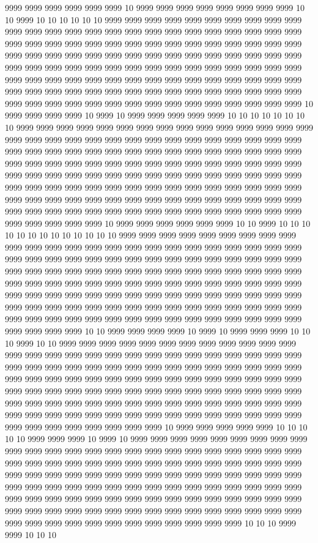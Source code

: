 9999 9999 9999 9999 9999 9999 10 9999 9999 9999 9999 9999 9999 9999 9999 10 10 9999 10 10 10 10 10 10 9999 9999 9999 9999 9999 9999 9999 9999 9999 9999 9999 9999 9999 9999 9999 9999 9999 9999 9999 9999 9999 9999 9999 9999 9999 9999 9999 9999 9999 9999 9999 9999 9999 9999 9999 9999 9999 9999 9999 9999 9999 9999 9999 9999 9999 9999 9999 9999 9999 9999 9999 9999 9999 9999 9999 9999 9999 9999 9999 9999 9999 9999 9999 9999 9999 9999 9999 9999 9999 9999 9999 9999 9999 9999 9999 9999 9999 9999 9999 9999 9999 9999 9999 9999 9999 9999 9999 9999 9999 9999 9999 9999 9999 9999 9999 9999 9999 9999 9999 9999 9999 9999 9999 9999 9999 9999 9999 9999 9999 9999 9999 9999 9999 9999 9999 10 9999 9999 9999 9999 10 9999 10 9999 9999 9999 9999 9999 10 10 10 10 10 10 10 10 9999 9999 9999 9999 9999 9999 9999 9999 9999 9999 9999 9999 9999 9999 9999 9999 9999 9999 9999 9999 9999 9999 9999 9999 9999 9999 9999 9999 9999 9999 9999 9999 9999 9999 9999 9999 9999 9999 9999 9999 9999 9999 9999 9999 9999 9999 9999 9999 9999 9999 9999 9999 9999 9999 9999 9999 9999 9999 9999 9999 9999 9999 9999 9999 9999 9999 9999 9999 9999 9999 9999 9999 9999 9999 9999 9999 9999 9999 9999 9999 9999 9999 9999 9999 9999 9999 9999 9999 9999 9999 9999 9999 9999 9999 9999 9999 9999 9999 9999 9999 9999 9999 9999 9999 9999 9999 9999 9999 9999 9999 9999 9999 9999 9999 9999 9999 9999 9999 9999 9999 9999 9999 9999 9999 9999 10 9999 9999 9999 9999 9999 9999 10 10 9999 10 10 10 10 10 10 10 10 10 10 10 10 10 9999 9999 9999 9999 9999 9999 9999 9999 9999 9999 9999 9999 9999 9999 9999 9999 9999 9999 9999 9999 9999 9999 9999 9999 9999 9999 9999 9999 9999 9999 9999 9999 9999 9999 9999 9999 9999 9999 9999 9999 9999 9999 9999 9999 9999 9999 9999 9999 9999 9999 9999 9999 9999 9999 9999 9999 9999 9999 9999 9999 9999 9999 9999 9999 9999 9999 9999 9999 9999 9999 9999 9999 9999 9999 9999 9999 9999 9999 9999 9999 9999 9999 9999 9999 9999 9999 9999 9999 9999 9999 9999 9999 9999 9999 9999 9999 9999 9999 9999 9999 9999 9999 9999 9999 9999 9999 9999 9999 9999 9999 9999 9999 9999 9999 9999 9999 9999 9999 10 10 9999 9999 9999 9999 10 9999 10 9999 9999 9999 10 10 10 9999 10 10 9999 9999 9999 9999 9999 9999 9999 9999 9999 9999 9999 9999 9999 9999 9999 9999 9999 9999 9999 9999 9999 9999 9999 9999 9999 9999 9999 9999 9999 9999 9999 9999 9999 9999 9999 9999 9999 9999 9999 9999 9999 9999 9999 9999 9999 9999 9999 9999 9999 9999 9999 9999 9999 9999 9999 9999 9999 9999 9999 9999 9999 9999 9999 9999 9999 9999 9999 9999 9999 9999 9999 9999 9999 9999 9999 9999 9999 9999 9999 9999 9999 9999 9999 9999 9999 9999 9999 9999 9999 9999 9999 9999 9999 9999 9999 9999 9999 9999 9999 9999 9999 9999 9999 9999 9999 9999 9999 9999 9999 9999 10 9999 9999 9999 9999 9999 10 10 10 10 10 9999 9999 9999 10 9999 10 9999 9999 9999 9999 9999 9999 9999 9999 9999 9999 9999 9999 9999 9999 9999 9999 9999 9999 9999 9999 9999 9999 9999 9999 9999 9999 9999 9999 9999 9999 9999 9999 9999 9999 9999 9999 9999 9999 9999 9999 9999 9999 9999 9999 9999 9999 9999 9999 9999 9999 9999 9999 9999 9999 9999 9999 9999 9999 9999 9999 9999 9999 9999 9999 9999 9999 9999 9999 9999 9999 9999 9999 9999 9999 9999 9999 9999 9999 9999 9999 9999 9999 9999 9999 9999 9999 9999 9999 9999 9999 9999 9999 9999 9999 9999 9999 9999 9999 9999 9999 9999 9999 9999 9999 9999 9999 9999 9999 9999 9999 9999 10 10 10 9999 9999 10 10 10 